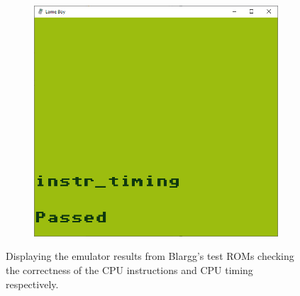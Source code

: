 \begin{figure}[H]
\begin{subfigure}{.5\textwidth}
  \includegraphics[width=0.9\linewidth]{figures/instr_timing_passed.PNG}
\end{subfigure}
\caption{Displaying the emulator results from  Blargg's test ROMs checking the correctness of the CPU instructions and CPU timing respectively.}
\label{fig:cputests}
\end{figure}   



